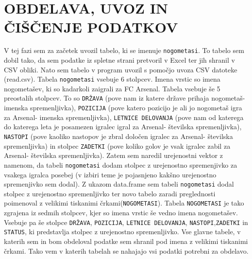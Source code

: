 \documentclass[11pt,a4paper]{article}
\begin{document}
\section{OBDELAVA, UVOZ IN ČIŠČENJE PODATKOV}
V tej fazi sem za začetek uvozil tabelo, ki se imenuje \verb|nogometasi|. To tabelo sem dobil tako, da sem podatke iz spletne strani pretvoril v Excel ter jih shranil v CSV obliki. Nato sem tabelo v program uvozil s pomočjo uvoza CSV datoteke (read.csv). Tabela \verb|nogometasi| vsebuje 6 stolpcev. Imena vrstic so imena nogometašev, ki so kadarkoli zaigrali za FC Arsenal. Tabela vsebuje še 5 preostalih stolpcev. To so \verb|DRŽAVA| (pove nam iz katere države prihaja nogometaš- imenska spremenljivka), \verb|POZICIJA| (pove katero pozicijo je ali jo nogometaš igra za Arsenal- imenska spremenljivka), \verb|LETNICE DELOVANJA| (pove nam od katerega do katerega leta je posamezen igralec igral za Arsenal- številska spremenljivka), \verb|NASTOPI| (pove kaoliko nastopov je zbral določen igralec za Arsenal- številska spremenljivka) in stolpec \verb|ZADETKI| (pove koliko golov je vsak igralec zabil za Arsenal- številska spremenljivka). Zatem sem naredil urejenostni vektor z namenom, da tabeli \verb|nogometasi| dodam stolpec z urejenostno spremenjivko za vsakega igralca posebej (v izbiri teme je pojasnjeno kakšno urejenostno spremenjivko sem dodal). Z ukazom data.frame sem tabeli \verb|nogometasi| dodal stolpec z urejenostno spremenljivko ter novo tabelo zaradi preglednosti poimenoval z velikimi tiskanimi črkami(\verb|NOGOMETASI|). Tabela \verb|NOGOMETASI| je tako zgrajena iz sedmih stolpcev, kjer so imena vrstic še vedno imena nogometašev. Vsebuje pa še stolpce \verb|DRŽAVA|, \verb|POZICIJA|, \verb|LETNICE DELOVANJA|, \verb|NASTOPI|,\verb|ZADETKI| in \verb|STATUS|, ki predstavlja stolpec z urejenostno spremenljivko. Vse glavne tabele, v katerih sem in bom obdeloval podatke sem shranil pod imena z velikimi tiskanimi črkami. Tako vem v katerih tabelah se nahajajo vsi podatki potrebni za obdelavo.
\end{document}
